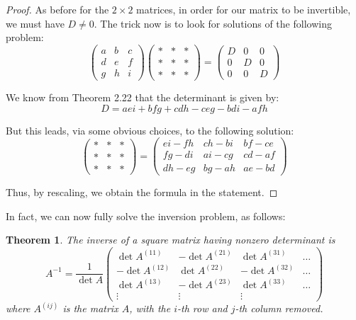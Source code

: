 \documentclass[12pt]{amsbook}
\newtheorem{theorem}{Theorem}[chapter]
\begin{document}
\begin{proof}
As before for the $2\times 2$ matrices, in order for our matrix to be invertible, we must have $D\neq0$. The trick now is to look for solutions of the following problem:
$$\begin{pmatrix}a&b&c\\ d&e&f\\ g&h&i\end{pmatrix}
\begin{pmatrix}*&*&*\\ *&*&*\\ *&*&*\end{pmatrix}
=\begin{pmatrix}D&0&0\\ 0&D&0\\ 0&0&D\end{pmatrix}$$

We know from Theorem 2.22 that the determinant is given by:
$$D=aei+bfg+cdh-ceg-bdi-afh$$

But this leads, via some obvious choices, to the following solution:
$$\begin{pmatrix}*&*&*\\ *&*&*\\ *&*&*\end{pmatrix}
=\begin{pmatrix}ei-fh&ch-bi&bf-ce\\ fg-di&ai-cg&cd-af\\ dh-eg&bg-ah&ae-bd\end{pmatrix}$$

Thus, by rescaling, we obtain the formula in the statement.
\end{proof}

In fact, we can now fully solve the inversion problem, as follows:


\begin{theorem}
The inverse of a square matrix having nonzero determinant is
$$A^{-1}=\frac{1}{\det A}
\begin{pmatrix}
\det A^{(11)}&-\det A^{(21)}&\det A^{(31)}&\ldots\\
-\det A^{(12)}&\det A^{(22)}&-\det A^{(32)}&\ldots\\
\det A^{(13)}&-\det A^{(23)}&\det A^{(33)}&\ldots\\
\vdots&\vdots&\vdots&
\end{pmatrix}$$
where $A^{(ij)}$ is the matrix $A$, with the $i$-th row and $j$-th column removed.
\end{theorem}
\end{document}
